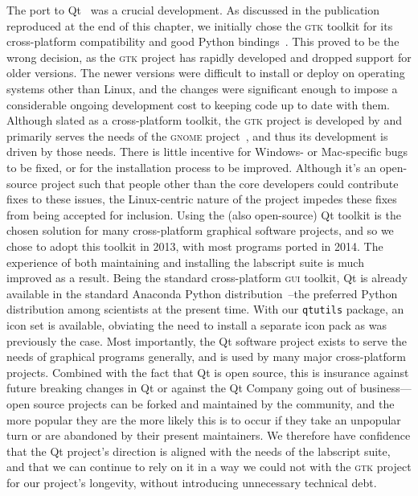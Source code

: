 The port to Qt~\cite{the_qt_company_qt_2018} was a crucial development. As discussed in the publication reproduced at the end of this chapter, we initially chose the \textsc{gtk} toolkit for its cross-platform compatibility and good Python bindings~\cite{riverbank_computing_pyqt_2018}. This proved to be the wrong decision, as the \textsc{gtk} project has rapidly developed and dropped support for older versions. The newer versions were difficult to install or deploy on operating systems other than Linux, and the changes were significant enough to impose a considerable ongoing development cost to keeping code up to date with them. Although slated as a cross-platform toolkit, the \textsc{gtk} project is developed by and primarily serves the needs of the \textsc{gnome} project~\cite{the_gnome_project_gnome_2018}, and thus its development is driven by those needs. There is little incentive for Windows- or Mac-specific bugs to be fixed, or for the installation process to be improved. Although it's an open-source project such that people other than the core developers could contribute fixes to these issues, the Linux-centric nature of the project impedes these fixes from being accepted for inclusion. Using the (also open-source) Qt toolkit is the chosen solution for many cross-platform graphical software projects, and so we chose to adopt this toolkit in 2013, with most programs ported in 2014. The experience of both maintaining and installing the labscript suite is much improved as a result. Being the standard cross-platform \textsc{gui} toolkit, Qt is already available in the standard Anaconda Python distribution~\cite{continuum_analytics_anaconda_2018}--the preferred Python distribution among scientists at the present time. With our \texttt{qtutils} package, an icon set is available, obviating the need to install a separate icon pack as was previously the case. Most importantly, the Qt software project exists to serve the needs of graphical programs generally, and is used by many major cross-platform projects. Combined with the fact that Qt is open source, this is insurance against future breaking changes in Qt or against the Qt Company going out of business---open source projects can be forked and maintained by the community, and the more popular they are the more likely this is to occur if they take an unpopular turn or are abandoned by their present maintainers. We therefore have confidence that the Qt project's direction is aligned with the needs of the labscript suite, and that we can continue to rely on it in a way we could not with the \textsc{gtk} project for our project's longevity, without introducing unnecessary technical debt.


